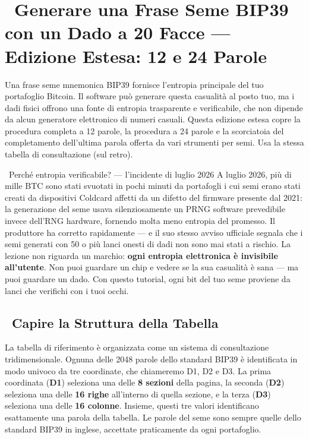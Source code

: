 \documentclass[10pt]{article}
\begin{document}
\section*{\faBitcoin~Generare una Frase Seme BIP39 con un Dado a 20 Facce --- Edizione Estesa: 12 e 24 Parole}

\footnotesize

Una frase seme mnemonica BIP39 fornisce l'entropia principale del tuo portafoglio Bitcoin. Il software può generare questa casualità al posto tuo, ma i dadi fisici offrono una fonte di entropia trasparente e verificabile, che non dipende da alcun generatore elettronico di numeri casuali. Questa edizione estesa copre la procedura completa a 12 parole, la procedura a 24 parole e la scorciatoia del completamento dell'ultima parola offerta da vari strumenti per semi. Usa la stessa tabella di consultazione (sul retro).

\begin{contextbox}{\faNewspaper~Perché entropia verificabile? --- l'incidente di luglio 2026}
A luglio 2026, più di mille BTC sono stati svuotati in pochi minuti da portafogli i cui semi erano stati creati da dispositivi Coldcard affetti da un difetto del firmware presente dal 2021: la generazione del seme usava silenziosamente un PRNG software prevedibile invece dell'RNG hardware, fornendo molta meno entropia del promesso. Il produttore ha corretto rapidamente --- e il suo stesso avviso ufficiale segnala che i semi generati con 50 o più lanci onesti di dadi non sono mai stati a rischio. La lezione non riguarda un marchio: \textbf{ogni entropia elettronica è invisibile all'utente}. Non puoi guardare un chip e vedere se la sua casualità è sana --- ma puoi guardare un dado. Con questo tutorial, ogni bit del tuo seme proviene da lanci che verifichi con i tuoi occhi.
\end{contextbox}

\subsection*{\faTable~Capire la Struttura della Tabella}

La tabella di riferimento è organizzata come un sistema di consultazione tridimensionale. Ognuna delle 2048 parole dello standard BIP39 è identificata in modo univoco da tre coordinate, che chiameremo D1, D2 e D3. La prima coordinata (\textbf{D1}) seleziona una delle \textbf{8 sezioni} della pagina, la seconda (\textbf{D2}) seleziona una delle \textbf{16 righe} all'interno di quella sezione, e la terza (\textbf{D3}) seleziona una delle \textbf{16 colonne}. Insieme, questi tre valori identificano esattamente una parola della tabella. Le parole del seme sono sempre quelle dello standard BIP39 in inglese, accettate praticamente da ogni portafoglio.
\end{document}
